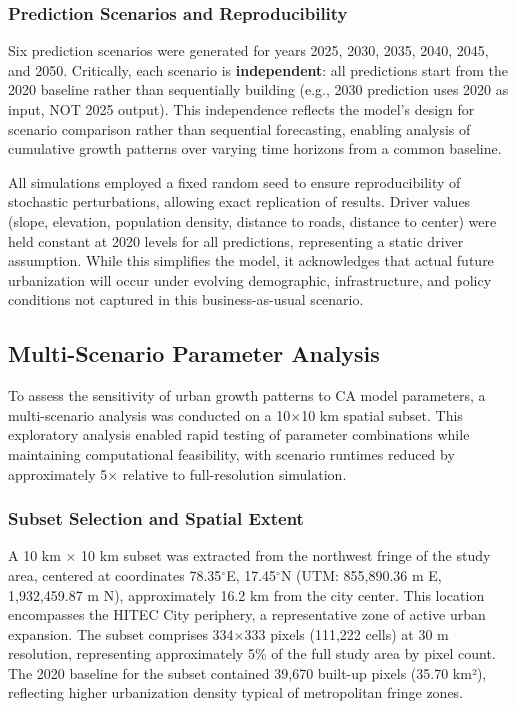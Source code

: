 \documentclass[conference]{IEEEtran}
\begin{document}
\subsubsection{Prediction Scenarios and Reproducibility}

Six prediction scenarios were generated for years 2025, 2030, 2035, 2040, 2045, and 2050. Critically, each scenario is \textbf{independent}: all predictions start from the 2020 baseline rather than sequentially building (e.g., 2030 prediction uses 2020 as input, NOT 2025 output). This independence reflects the model's design for scenario comparison rather than sequential forecasting, enabling analysis of cumulative growth patterns over varying time horizons from a common baseline.

All simulations employed a fixed random seed to ensure reproducibility of stochastic perturbations, allowing exact replication of results. Driver values (slope, elevation, population density, distance to roads, distance to center) were held constant at 2020 levels for all predictions, representing a static driver assumption. While this simplifies the model, it acknowledges that actual future urbanization will occur under evolving demographic, infrastructure, and policy conditions not captured in this business-as-usual scenario.

\subsection{Multi-Scenario Parameter Analysis}

To assess the sensitivity of urban growth patterns to CA model parameters, a multi-scenario analysis was conducted on a 10$\times$10 km spatial subset. This exploratory analysis enabled rapid testing of parameter combinations while maintaining computational feasibility, with scenario runtimes reduced by approximately 5$\times$ relative to full-resolution simulation.

\subsubsection{Subset Selection and Spatial Extent}

A 10 km $\times$ 10 km subset was extracted from the northwest fringe of the study area, centered at coordinates 78.35$^\circ$E, 17.45$^\circ$N (UTM: 855,890.36 m E, 1,932,459.87 m N), approximately 16.2 km from the city center. This location encompasses the HITEC City periphery, a representative zone of active urban expansion. The subset comprises 334$\times$333 pixels (111,222 cells) at 30 m resolution, representing approximately 5\% of the full study area by pixel count. The 2020 baseline for the subset contained 39,670 built-up pixels (35.70 km²), reflecting higher urbanization density typical of metropolitan fringe zones.
\end{document}
